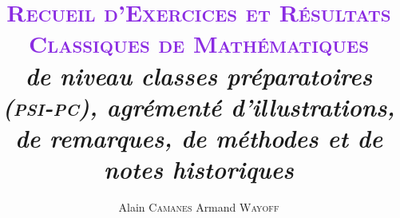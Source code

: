 \documentclass[
	a4paper, %
	fontsize=11pt, %
	twoside=true, %
	chapterentrydots=true, %
	numbers=noenddot, %
]{kaobook}
\begin{document}


\title[Recueil des Exercices et Résultats Classiques de Mathématiques]{
\fontsize{26pt}{28pt}\selectfont
\textcolor{BlueViolet}{\textrm{\textsc{
Recueil d'Exercices et Résultats Classiques de Mathématiques
}}}
\\ \vspace{0.6cm}
\fontsize{16pt}{18pt}\selectfont
\textrm{\textsl{
de niveau classes préparatoires (\textsc{psi}-\textsc{pc}), agrémenté d’illustrations, de remarques, de méthodes et de notes historiques
}}
\\}

\author[Alain Camanes, Armand Wayoff]{Alain \textsc{Camanes} \coauteur Armand \textsc{Wayoff}}

\date{}



\frontmatter %



\maketitle

\end{document}
